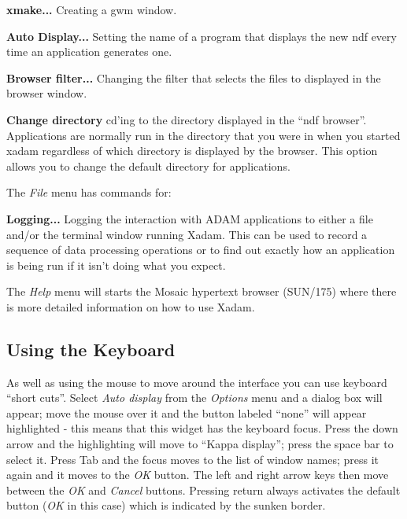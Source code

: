 \begin{list}{}{\setlength{\rightmargin}{\leftmargin}}
\item[\bf xmake...] Creating a gwm window. 

\item[\bf Auto Display...] Setting the name of a program that displays
the new ndf every time an application generates one.

\item[\bf Browser filter...] Changing the filter that selects the files
to displayed in the browser window.

\item[\bf Change directory] cd'ing to the directory displayed in the 
``ndf browser''. Applications are normally run in the directory that
you were in when you started xadam regardless of which directory is 
displayed by the browser. This option allows you to change the default
directory for applications.

\end{list}

The {\em File} menu has commands for:

\begin{list}{}{\setlength{\rightmargin}{\leftmargin}}

\item[\bf Logging...] Logging the interaction with ADAM applications to
either a file and/or the terminal window running Xadam. This can be
used to record a sequence of data processing operations or to find out
exactly how an application is being run if it isn't doing what you
expect.

\end{list}

The {\em Help} menu will starts the Mosaic hypertext browser (SUN/175) 
where there is more detailed information on how to use Xadam.

\subsection{Using the Keyboard}

As well as using the mouse to move around the interface you can use
keyboard ``short cuts''. Select {\em Auto display} from the {\em
Options} menu and a dialog box will appear; move the mouse over it and
the button labeled ``none'' will appear highlighted - this means that
this widget has the keyboard focus. Press the down arrow and the
highlighting will move to ``Kappa display''; press the space bar to
select it. Press Tab and the focus moves to the list of window names;
press it again and it moves to the {\em OK} button. The left and right
arrow keys then move between the {\em OK} and {\em Cancel} buttons.
Pressing return always activates the default button ({\em OK} in this
case) which is indicated by the sunken border.

